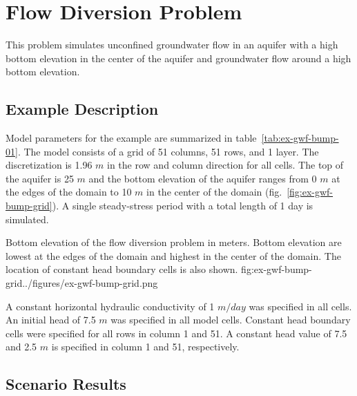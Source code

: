 \section{Flow Diversion Problem}

This problem simulates unconfined groundwater flow in an aquifer with a high bottom elevation in the center of the aquifer and groundwater flow around a high bottom elevation.

\subsection{Example Description}
Model parameters for the example are summarized in table~\ref{tab:ex-gwf-bump-01}. The model consists of a grid of 51 columns, 51 rows, and 1 layer. The discretization is 1.96 $m$ in the row and column direction for all cells. The top of the aquifer is 25 $m$ and the bottom elevation of the aquifer ranges from 0 $m$ at the edges of the domain to 10 $m$ in the center of the domain (fig.~\ref{fig:ex-gwf-bump-grid}). A single steady-stress period with a total length of 1 day is simulated.


\begin{StandardFigure}{
                                     Bottom elevation of the flow diversion problem in meters. Bottom elevation are lowest at 
                                     the edges of the domain and highest in the center of the domain. The location of constant
                                     head boundary cells is also shown.
                                     }{fig:ex-gwf-bump-grid}{../figures/ex-gwf-bump-grid.png}
\end{StandardFigure}                                 




A constant horizontal hydraulic conductivity of 1 $m/day$ was specified in all cells. An initial head of 7.5 $m$ was specified in all model cells. Constant head boundary cells were specified for all rows in column 1 and 51. A constant head value of 7.5 and 2.5 $m$ is specified in column 1 and 51, respectively.


\subsection{Scenario Results}

